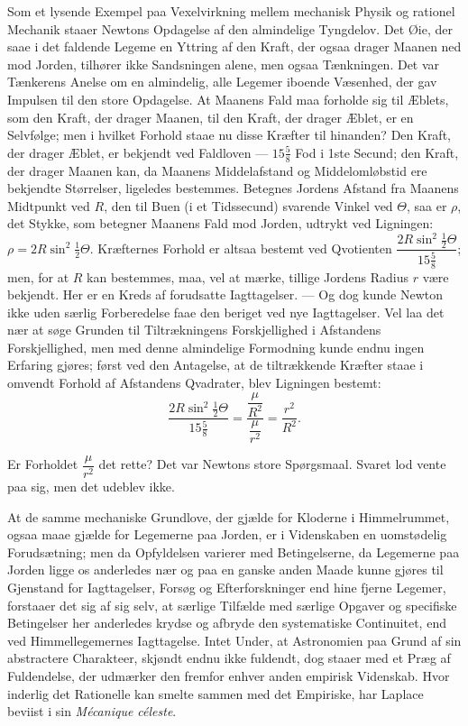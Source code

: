 \documentclass[12pt]{book}
\newcommand{\apage}[1]{\marginnote{\footnotesize\textit{[#1]}}}
\begin{document}
Som et lysende Exempel paa Vexelvirkning mellem mechanisk Physik og
rationel Mechanik staaer Newtons Opdagelse af den almindelige Tyngdelov.
Det Øie, der saae i det faldende Legeme en Yttring af den Kraft, der ogsaa
drager Maanen ned mod Jorden, tilhører ikke Sandsningen alene, men ogsaa
Tænkningen. Det var Tænkerens Anelse om en almindelig, alle Legemer iboende
Væsenhed, der gav Impulsen til den store Opdagelse. At Maanens Fald maa
forholde sig til Æblets, som den Kraft, der drager Maanen, til den Kraft,
der drager Æblet, er en Selvfølge; men i hvilket Forhold staae nu disse
Kræfter til hinanden? Den Kraft, der drager Æblet, er bekjendt ved
Faldloven --- $15\tfrac58$ Fod i 1ste Secund; den Kraft, der drager \apage{137} Maanen kan,
da Maanens Middelafstand og Middelomløbstid ere bekjendte Størrelser,
ligeledes bestemmes. Betegnes Jordens Afstand fra Maanens Midtpunkt ved
$R$, den til Buen (i et Tidssecund) svarende Vinkel ved $\Theta$, saa er
$\rho$, det Stykke, som betegner Maanens Fald mod Jorden, udtrykt ved
Ligningen: $\rho = 2R\sin^2\tfrac12\Theta$. Kræfternes Forhold er altsaa
bestemt ved Qvotienten $\dfrac{2R\sin^2\tfrac12\Theta}{15\tfrac58}$; men,
for at $R$ kan bestemmes, maa, vel at mærke, tillige Jordens Radius $r$
være bekjendt. Her er en Kreds af forudsatte Iagttagelser. --- Og dog kunde
Newton ikke uden særlig Forberedelse faae den beriget ved nye
Iagttagelser. Vel laa det nær at søge Grunden til Tiltrækningens
Forskjellighed i Afstandens Forskjellighed, men med denne almindelige
Formodning kunde endnu ingen Erfaring gjøres; først ved den Antagelse, at
de tiltrækkende Kræfter staae i omvendt Forhold af Afstandens Qvadrater,
blev Ligningen bestemt:
\[
  \frac{2R\sin^2\tfrac12\Theta}{15\tfrac58} = \frac{\dfrac{\mu}{R^2}}{\dfrac{\mu}{r^2}} = \frac{r^2}{R^2}.
\]

Er Forholdet $\dfrac{\mu}{r^2}$ det rette? Det var Newtons store
Spørgsmaal. Svaret lod vente paa sig, men det udeblev ikke.

At de samme mechaniske Grundlove, der gjælde for Kloderne i Himmelrummet,
ogsaa maae gjælde for Legemerne paa Jorden, er i Videnskaben en uomstødelig
Forudsætning; men da Opfyldelsen varierer med Betingelserne, da Legemerne
paa Jorden ligge os \apage{138} anderledes nær og paa en ganske anden Maade kunne
gjøres til Gjenstand for Iagttagelser, Forsøg og Efterforskninger end hine
fjerne Legemer, forstaaer det sig af sig selv, at særlige Tilfælde med
særlige Opgaver og specifiske Betingelser her anderledes krydse og afbryde
den systematiske Continuitet, end ved Himmellegemernes Iagttagelse. Intet
Under, at Astronomien paa Grund af sin abstractere Charakteer, skjøndt
endnu ikke fuldendt, dog staaer med et Præg af Fuldendelse, der udmærker
den fremfor enhver anden empirisk Videnskab. Hvor inderlig det Rationelle
kan smelte sammen med det Empiriske, har Laplace beviist i sin
\emph{Mécanique céleste}.
\end{document}
